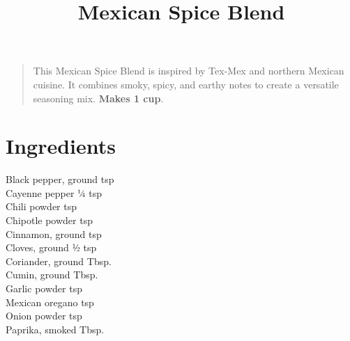 \documentclass[11pt,letterpaper]{article}
\title{Mexican Spice Blend}
\author{}
\date{}
\begin{document}
\maketitle
\thispagestyle{empty}

\begin{quote}
\small
\begin{em}
This Mexican Spice Blend is inspired by Tex-Mex and northern Mexican cuisine. It combines smoky, spicy, and earthy notes to create a versatile seasoning mix. \textbf{Makes 1 cup}.
\end{em}
\end{quote}

\section*{Ingredients}
\setlength{\columnsep}{20pt}

    Black pepper, ground  tsp \\
    Cayenne pepper \dotfill ¼ tsp \\
    Chili powder  tsp \\
    Chipotle powder  tsp \\
    Cinnamon, ground  tsp \\
    Cloves, ground \dotfill ½ tsp \\
    Coriander, ground  Tbsp. \\
    Cumin, ground  Tbsp. \\
    Garlic powder  tsp \\
    Mexican oregano  tsp \\
    Onion powder  tsp \\
    Paprika, smoked  Tbsp. \\
\end{document}
